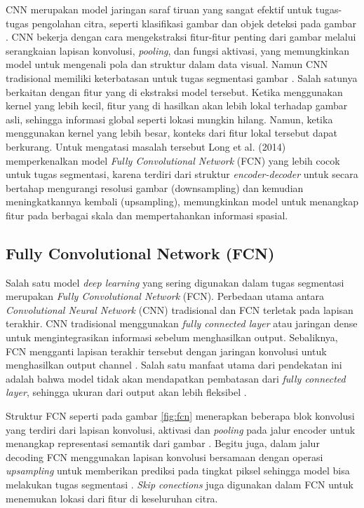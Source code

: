 \noindent CNN merupakan model jaringan saraf tiruan yang sangat efektif untuk tugas-tugas pengolahan citra, seperti klasifikasi gambar dan objek deteksi pada gambar \cite{celeghin_convolutional_2023}. CNN bekerja dengan cara mengekstraksi fitur-fitur penting dari gambar melalui serangkaian lapisan konvolusi, \textit{pooling}, dan fungsi aktivasi, yang memungkinkan model untuk mengenali pola dan struktur dalam data visual. Namun CNN tradisional memiliki keterbatasan untuk tugas segmentasi  gambar \cite{huang_fully_2022, azad_medical_2022, jasim_towards_2023}. Salah satunya berkaitan dengan fitur yang di ekstraksi model tersebut. Ketika menggunakan kernel yang lebih kecil, fitur yang di hasilkan akan lebih lokal terhadap gambar asli, sehingga informasi global seperti lokasi mungkin hilang. Namun, ketika menggunakan kernel yang lebih besar, konteks dari fitur lokal tersebut dapat berkurang. Untuk mengatasi masalah tersebut Long et al. (2014) \cite{long_fully_2014} memperkenalkan model \textit{Fully Convolutional Network} (FCN) yang lebih cocok untuk tugas segmentasi, karena terdiri dari struktur \textit{encoder-decoder} untuk secara bertahap mengurangi resolusi gambar (downsampling) dan kemudian meningkatkannya kembali (upsampling), memungkinkan model untuk menangkap fitur pada berbagai skala dan mempertahankan informasi spasial.


\subsection{Fully Convolutional Network (FCN)}

Salah satu model \textit{deep learning} yang sering digunakan dalam tugas segmentasi merupakan \textit{Fully Convolutional Network }(FCN). Perbedaan utama antara \textit{Convolutional Neural Network} (CNN) tradisional dan FCN terletak pada lapisan terakhir. CNN tradisional menggunakan \textit{fully connected layer} atau jaringan dense untuk mengintegrasikan informasi sebelum menghasilkan output. Sebaliknya, FCN mengganti lapisan terakhir tersebut dengan jaringan konvolusi untuk menghasilkan output channel \cite{shlezinger_model-based_2023,huang_fully_2022}. Salah satu manfaat utama dari pendekatan ini adalah bahwa model tidak akan mendapatkan pembatasan dari \textit{fully connected layer}, sehingga ukuran dari output	 akan lebih fleksibel \cite{iqbal_analyses_2023}.


Struktur FCN seperti pada gambar \ref{fig:fcn} menerapkan beberapa blok konvolusi yang terdiri dari lapisan konvolusi, aktivasi dan \textit{pooling} pada jalur encoder untuk menangkap representasi semantik dari gambar \cite{azad_medical_2022}. Begitu juga, dalam jalur decoding FCN menggunakan lapisan konvolusi bersamaan dengan operasi \textit{upsampling} untuk memberikan prediksi pada tingkat piksel sehingga model bisa melakukan tugas segmentasi \cite{deng_fcn_2023}. \textit{Skip conections} juga digunakan dalam FCN untuk menemukan lokasi dari fitur di keseluruhan citra. 

